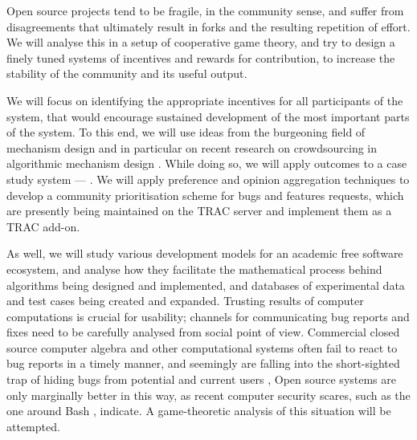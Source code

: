 \begin{workpackage}[id=social-aspects,wphases=0-48,
  title=Social Aspects,
  lead=UO,
  UORM=53,USHRM=8, USORM=6]
\begin{wpdescription}
Open source projects tend to be fragile, in the community sense, and
suffer from disagreements that ultimately result in forks and the
resulting repetition of effort. We will analyse this in a setup of
cooperative game theory, and try to design a finely tuned systems of
incentives and rewards for contribution, to increase the stability of
the community and its useful output.

We will focus on identifying the appropriate incentives for all
participants of the system, that would encourage sustained development
of the most important parts of the system.  To this end, we will use
ideas from the burgeoning field of mechanism design \cite{AGTbook} and
in particular on recent research on crowdsourcing in algorithmic
mechanism design \cite{crowds}.  While doing so, we will apply
outcomes to a case study system --- \Sage.  We will apply preference
and opinion aggregation techniques \cite{pref-aggr} to develop a
community prioritisation scheme for \Sage bugs and features requests,
which are presently being maintained on the \Sage TRAC server
\cite{trac-sagemath} and implement them as a TRAC \cite{Trac} add-on.

As well, we will study various development models for an academic free
software ecosystem, and analyse how they facilitate the mathematical
process behind algorithms being designed and implemented, and
databases of experimental data and test cases being created and
expanded.  Trusting results of computer computations is crucial for
usability; channels for communicating bug reports and fixes need to be
carefully analysed from social point of view.  Commercial closed
source computer algebra and other computational systems often fail to
react to bug reports in a timely manner, and seemingly are falling
into the short-sighted trap of hiding bugs from potential and current
users \cite{misfort}, Open source systems are only marginally better
in this way, as recent computer security scares, such as the one
around Bash \cite{shellshock}, indicate.  A game-theoretic analysis of
this situation will be attempted.
\end{wpdescription}


\end{workpackage}
